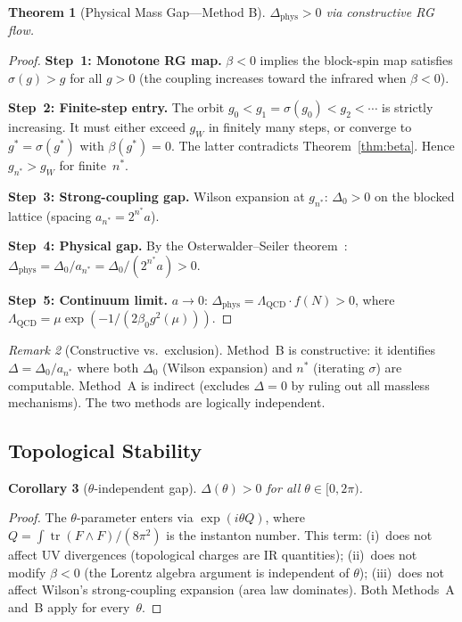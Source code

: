 \documentclass[12pt,a4paper]{article}
\theoremstyle{plain}
\newtheorem{theorem}{Theorem}[section]
\newtheorem{corollary}[theorem]{Corollary}
\theoremstyle{definition}
\theoremstyle{remark}
\newtheorem{remark}[theorem]{Remark}
\begin{document}
\begin{theorem}[Physical Mass Gap---Method B]\label{thm:physB}
$\Delta_{\mathrm{phys}}>0$ via constructive RG flow.
\end{theorem}

\begin{proof}
\textbf{Step~1: Monotone RG map.} $\beta<0$ implies the block-spin map satisfies $\sigma(g)>g$ for all $g>0$ (the coupling increases toward the infrared when $\beta<0$).

\textbf{Step~2: Finite-step entry.} The orbit $g_0<g_1=\sigma(g_0)<g_2<\cdots$ is strictly increasing. It must either exceed $g_W$ in finitely many steps, or converge to $g^*=\sigma(g^*)$ with $\beta(g^*)=0$. The latter contradicts Theorem~\ref{thm:beta}. Hence $g_{n^*}>g_W$ for finite~$n^*$.

\textbf{Step~3: Strong-coupling gap.} Wilson expansion at $g_{n^*}$: $\Delta_0>0$ on the blocked lattice (spacing $a_{n^*}=2^{n^*}a$).

\textbf{Step~4: Physical gap.} By the Osterwalder--Seiler theorem~\cite{OsterwalderSeiler1978}:
$\Delta_{\mathrm{phys}}=\Delta_0/a_{n^*}=\Delta_0/(2^{n^*}a)>0$.

\textbf{Step~5: Continuum limit.} $a\to 0$: $\Delta_{\mathrm{phys}}=\Lambda_{\mathrm{QCD}}\cdot f(N)>0$, where $\Lambda_{\mathrm{QCD}}=\mu\exp(-1/(2\beta_0 g^2(\mu)))$.
\end{proof}

\begin{remark}[Constructive vs.\ exclusion]
Method~B is constructive: it identifies $\Delta=\Delta_0/a_{n^*}$ where both $\Delta_0$ (Wilson expansion) and $n^*$ (iterating $\sigma$) are computable. Method~A is indirect (excludes $\Delta=0$ by ruling out all massless mechanisms). The two methods are logically independent.
\end{remark}

\subsection{Topological Stability}\label{sec:theta}

\begin{corollary}[$\theta$-independent gap]\label{cor:theta}
$\Delta(\theta)>0$ for all $\theta\in[0,2\pi)$.
\end{corollary}

\begin{proof}
The $\theta$-parameter enters via $\exp(i\theta Q)$, where $Q=\int\operatorname{tr}(F\wedge F)/(8\pi^2)$ is the instanton number. This term: (i)~does not affect UV divergences (topological charges are IR quantities); (ii)~does not modify $\beta<0$ (the Lorentz algebra argument is independent of $\theta$); (iii)~does not affect Wilson's strong-coupling expansion (area law dominates). Both Methods~A and~B apply for every~$\theta$.
\end{proof}
\end{document}

